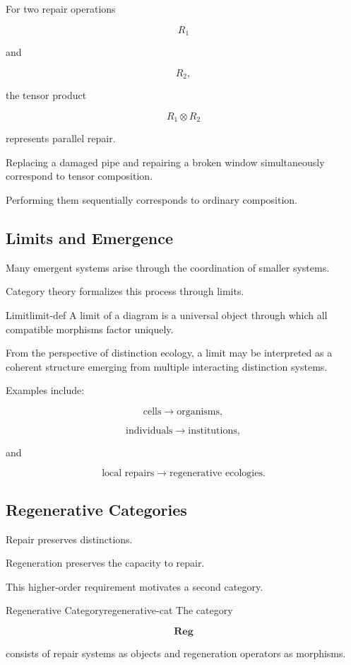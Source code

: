 \documentclass[12pt,twoside,openright]{book}
\newenvironment{ex}
{\begin{example}{}{}}
{\end{example}}
\begin{document}
For two repair operations

\[
R_1
\]

and

\[
R_2,
\]

the tensor product

\[
R_1\otimes R_2
\]

represents parallel repair.

\begin{ex}
Replacing a damaged pipe and repairing a broken window
simultaneously correspond to tensor composition.

Performing them sequentially corresponds to ordinary
composition.
\end{ex}

\subsection{Limits and Emergence}

Many emergent systems arise through the coordination of
smaller systems.

Category theory formalizes this process through limits.

\begin{definition}{Limit}{limit-def}
A limit of a diagram is a universal object through which
all compatible morphisms factor uniquely.
\end{definition}

From the perspective of distinction ecology, a limit may
be interpreted as a coherent structure emerging from
multiple interacting distinction systems.

Examples include:

\[
\text{cells}
\rightarrow
\text{organisms},
\]

\[
\text{individuals}
\rightarrow
\text{institutions},
\]

and

\[
\text{local repairs}
\rightarrow
\text{regenerative ecologies}.
\]

\subsection{Regenerative Categories}

Repair preserves distinctions.

Regeneration preserves the capacity to repair.

This higher-order requirement motivates a second category.

\begin{definition}{Regenerative Category}{regenerative-cat}
The category

\[
\mathbf{Reg}
\]

consists of repair systems as objects and regeneration
operators as morphisms.
\end{definition}
\end{document}
